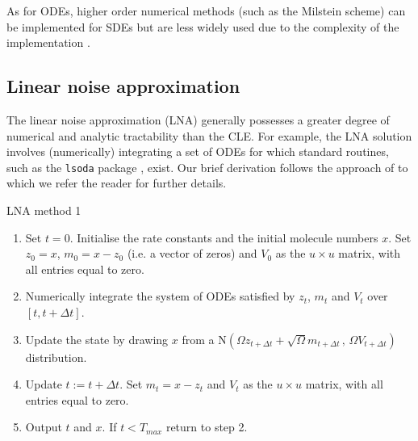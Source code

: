 \documentclass[12pt, DIV12]{scrartcl}
\begin{document}
As for ODEs, higher order numerical methods (such as the Milstein scheme) can be
implemented for SDEs but are less widely used due to the complexity of the
implementation \cite{Kloeden92}.

\subsection{Linear noise approximation}

The linear noise approximation (LNA) generally possesses a greater degree of
numerical and analytic tractability than the CLE. For example, the LNA solution
involves (numerically) integrating a set of ODEs for which standard routines,
such as the \texttt{lsoda} package \citep{petzold83}, exist. Our brief
derivation follows the approach of \cite{Wilkinson06} to which we refer the
reader for further details.

\begin{algorithm}[t]
\caption{LNA method 1}\label{A4}
\begin{enumerate}
\item Set $t=0$. Initialise the rate constants and the initial molecule numbers
  $x$. Set $z_{0}=x$, $m_{0}=x-z_{0}$ (i.e. a vector of zeros) and $V_{0}$ as
  the $u\times u$ matrix, with all entries equal to zero.
\item Numerically integrate the system of ODEs satisfied by $z_t$, $m_t$ and
  $V_t$ over $[t,t+\Delta t]$.
\item Update the state by drawing $x$ from a $\textrm{N}\left(\Omega z_{t+\Delta
      t}+\sqrt{\Omega}m_{t+\Delta t}\,,\, \Omega V_{t+\Delta t}\right)$
  distribution.
\item Update $t:=t+\Delta t$. Set $m_{t}=x-z_{t}$ and $V_{t}$ as the $u\times u$
  matrix, with all entries equal to zero.
\item Output $t$ and $x$. If $t<T_{max}$ return to step 2.
\end{enumerate}
\end{algorithm}
\end{document}
